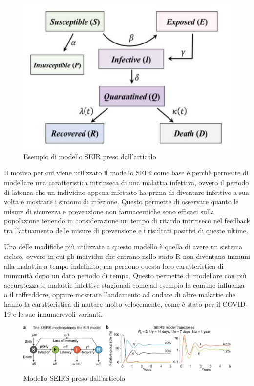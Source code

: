 \newpage

\begin{figure}[h]
    \includegraphics[width=\linewidth]{img/ijerph-17-03535-g001.png}
    \caption{Esempio di modello SEIR preso dall'articolo \cite{ijerph17103535}}
    \label{fig:SEIR_model}
\end{figure}

Il motivo per cui viene utilizzato il modello SEIR come base è perchè permette di 
modellare una caratteristica intrinseca di una malattia infettiva, ovvero 
il periodo di latenza che un individuo appena infettato ha prima di diventare 
infettivo a sua volta e mostrare i sintomi di infezione. Questo permette 
di osservare quanto le misure di sicurezza e prevenzione non farmaceutiche 
sono efficaci sulla popolazione tenendo in considerazione 
un tempo di ritardo intrinseco nel feedback tra l'attuamento delle 
misure di prevensione e i risultati positivi di queste ultime.

Una delle modifiche più utilizzate a questo modello è quella di avere un sistema 
ciclico, ovvero in cui gli individui che entrano nello stato R non diventano immuni 
alla malattia a tempo indefinito, ma perdono questa loro caratteristica di immunità
dopo un dato periodo di tempo. Questo permette di modellare con più accuratezza le malattie
infettive stagionali come ad esempio la comune influenza o il raffreddore, oppure 
mostrare l'andamento ad ondate di altre malattie che hanno la caratteristica di 
mutare molto velocemente, come è stato per il COVID-19 e le sue innumerevoli varianti.

\newpage

\begin{figure}[h]
    \includegraphics[width=\linewidth]{img/41592_2020_856_Fig1_HTML.png}
    \caption{Modello SEIRS preso dall'articolo \cite{Bjornstad2020}}
    \label{fig:SEIRS_model}
\end{figure}

